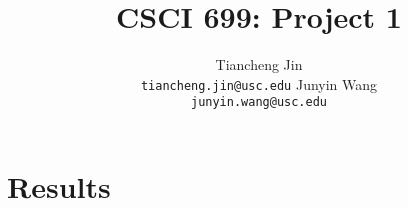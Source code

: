 \documentclass{article}
\title{CSCI 699: Project 1}
\author{%
Tiancheng Jin \\
\texttt{tiancheng.jin@usc.edu} \And
Junyin Wang \\
\texttt{junyin.wang@usc.edu} \\
}
\begin{document}
\maketitle

\begin{abstract}
	
\end{abstract}



\section{Results}
\label{sec:results}













\end{document}
